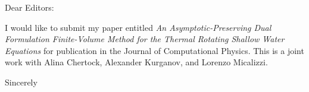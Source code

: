 \documentclass[letter,12pt]{letter}
\begin{document}
\begin{letter}{}

\opening{Dear Editors:} %

\vspace*{1cm}
I would like to submit my paper entitled {\it An Asymptotic-Preserving Dual Formulation Finite-Volume Method for the Thermal Rotating
Shallow Water Equations} for publication in the Journal of Computational Physics. This is a joint work with Alina Chertock, Alexander
Kurganov, and Lorenzo Micalizzi.


\vspace*{2cm}
\closing{Sincerely} %

\end{letter}
\end{document}
